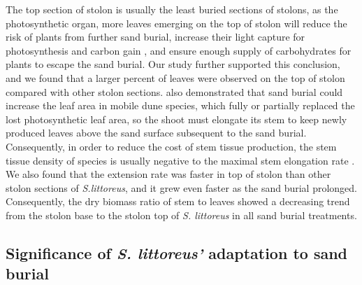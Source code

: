 \documentclass[]{interact}
\theoremstyle{plain}%
\theoremstyle{definition}
\theoremstyle{remark}
\begin{document}
The top section of stolon is usually the least buried sections of stolons, as the photosynthetic organ, more leaves emerging on the top of stolon will reduce the risk of plants from further sand burial, increase their light capture for photosynthesis and carbon gain \citep{yuanEffectsSandAccretion1993, shiEffectsSandBurial2004, brownMechanismsSurvivingBurial2018}, and ensure enough supply of carbohydrates for plants to escape the sand burial. Our study further supported this conclusion, and we found that a larger percent of leaves were observed on the top of stolon compared with other stolon sections. \citet{gilbertGrowthResponsesCoastal2008} also demonstrated that sand burial could increase the leaf area in mobile dune species, which fully or partially replaced the lost photosynthetic leaf area, so the shoot must elongate its stem to keep newly produced leaves above the sand surface subsequent to the sand burial. Consequently, in order to reduce the cost of stem tissue production, the stem tissue density of species is usually negative to the maximal stem elongation rate \citep{frosiniGlobalChangeResponse2012}. We also found that the extension rate was faster in top of stolon than other stolon sections of \textit{S.littoreus}, and it grew even faster as the sand burial prolonged. Consequently, the dry biomass ratio of stem to leaves showed a decreasing trend from the stolon base to the stolon top of \textit{S. littoreus} in all sand burial treatments. 


\subsection{Significance of \textit{\textit{S. littoreus}'} adaptation to sand burial}
\end{document}
